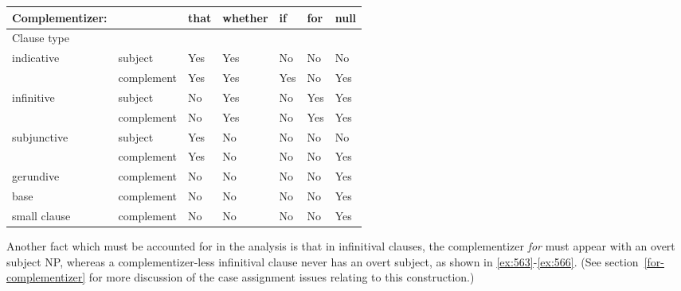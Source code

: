 \beginsentences
{}\label{ex:557} 
\label{ex:558} 
\label{ex:559} 
\label{ex:560} 
\label{ex:561} 
\label{ex:562} 
\endsentences

 
 
\begin{table}[ht] 
\centering 
\begin{tabular}{|l|llllll|} \hline 
Complementizer:&&that&whether&if&for&null\\ 
\hline 
Clause type&&&&&&\\ 
\hline 
indicative&subject&Yes&Yes&No&No&No\\ 
&complement&Yes&Yes&Yes&No&Yes\\ 
\hline 
infinitive&subject&No&Yes&No&Yes&Yes\\ 
&complement&No&Yes&No&Yes&Yes\\ 
\hline 
subjunctive&subject&Yes&No&No&No&No\\ 
&complement&Yes&No&No&No&Yes\\ 
\hline 
gerundive\footnotemark\ &complement&No&No&No&No&Yes\\ 
\hline 
base & complement & No & No & No & No & Yes \\ 
\hline 
small clause & complement & No & No & No & No & Yes \\ 
\hline 
\end{tabular} 
\vspace{.2in} 
\begin{rawhtml} <dl> <dt>{Summary of Complementizer and Clause Combinations <p> </dl> \end{rawhtml}
\label{facts} 
\end{table} 
 
 
Another fact which must be accounted for in the analysis is that in infinitival 
clauses, the complementizer {\it for} must appear with an overt subject NP, 
whereas a complementizer-less infinitival clause never has an overt subject, as 
shown in \ref{ex:563}-\ref{ex:566}. (See section~\ref{for-complementizer} for more 
discussion of the case assignment issues relating to this construction.) 
 
